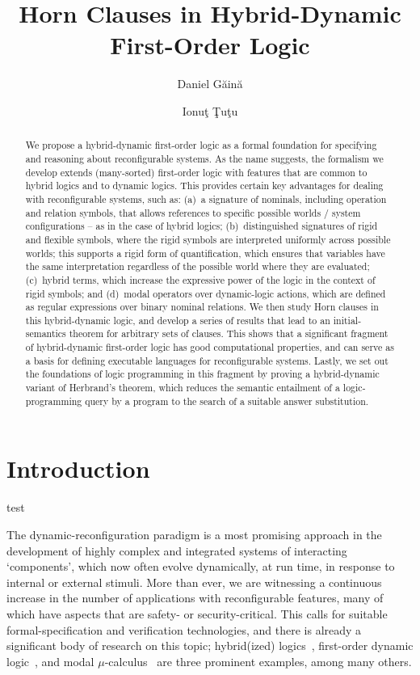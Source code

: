 \documentclass[a4paper,UKenglish,cleveref,autoref]{lipics-v2019}
\title{Horn Clauses in Hybrid-Dynamic First-Order Logic}
\author{Daniel G\u{a}in\u{a}}{%
  Institute of Mathematics for Industry, Kyushu University, Japan \and
  Department of Mathematics and Statistics, La Trobe University, Australia%
}{%
  daniel@imi.kyushu-u.ac.jp%
}{}{}
\author{Ionu\c{t} \c{T}u\c{t}u}{
  Simion Stoilow Institute of Mathematics of the Romanian Academy, Romania \and
  Department of Computer Science, Royal Holloway University of London, UK%
}{%
  ittutu@gmail.com%
}{}{}
\begin{document}
\maketitle

\begin{abstract}
  We propose a hybrid-dynamic first-order logic as a formal foundation for specifying and reasoning about reconfigurable systems.
  As the name suggests, the formalism we develop extends (many-sorted) first-order logic with features that are common to hybrid logics and to dynamic logics.
  This provides certain key advantages for dealing with reconfigurable systems, such as:
  (a)~a signature of nominals, including operation and relation symbols, that allows references to specific possible worlds / system configurations -- as in the case of hybrid logics;
  (b)~distinguished signatures of rigid and flexible symbols, where the rigid symbols are interpreted uniformly across possible worlds; this supports a rigid form of quantification, which ensures that variables have the same interpretation regardless of the possible world where they are evaluated;
  (c)~hybrid terms, which increase the expressive power of the logic in the context of rigid symbols; and
  (d)~modal operators over dynamic-logic actions, which are defined as regular expressions over binary nominal relations.
  We then study Horn clauses in this hybrid-dynamic logic, and develop a series of results that lead to an initial-semantics theorem for arbitrary sets of clauses.
  This shows that a significant fragment of hybrid-dynamic first-order logic has good computational properties, and can serve as a basis for defining executable languages for reconfigurable systems.
  Lastly, we set out the foundations of logic programming in this fragment by proving a hybrid-dynamic variant of Herbrand's theorem, which reduces the semantic entailment of a logic-programming query by a program to the search of a suitable answer substitution.
\end{abstract}


\section{Introduction}

test

The dynamic-reconfiguration paradigm is a most promising approach in the development of highly complex and integrated systems of interacting `components', which now often evolve dynamically, at run time, in response to internal or external stimuli.
More than ever, we are witnessing a continuous increase in the number of applications with reconfigurable features, many of which have aspects that are safety- or security-critical.
This calls for suitable formal-specification and verification technologies, and there is already a significant body of research on this topic; hybrid(ized) logics~\cite{Brauner11,MartinsMDB11}, first-order dynamic logic~\cite{HarelKT01}, and modal $\mu$-calculus~\cite{GrooteM2014} are three prominent examples, among many others.
\end{document}
